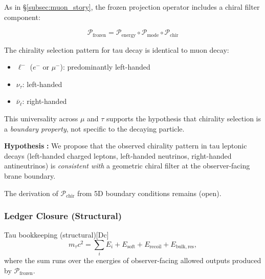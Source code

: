 As in \S\ref{subsec:muon_story}, the frozen projection operator includes a chiral
filter component:

\begin{equation}
    \mathcal{P}_{\mathrm{frozen}} = \mathcal{P}_{\mathrm{energy}} \circ
    \mathcal{P}_{\mathrm{mode}} \circ \mathcal{P}_{\mathrm{chir}}
    \label{eq:tau-projection-stack}
\end{equation}

The chirality selection pattern for tau decay is identical to muon decay:
\begin{itemize}[nosep]
    \item $\ell^-$ ($e^-$ or $\mu^-$): predominantly left-handed
    \item $\nu_\tau$: left-handed
    \item $\bar{\nu}_\ell$: right-handed
\end{itemize}

This universality across $\mu$ and $\tau$ supports the hypothesis that
chirality selection is a \emph{boundary property}, not specific to the
decaying particle.

\begin{tcolorbox}[mechanism, title={Chiral Filter (Hypothesis)}]
\textbf{Hypothesis} \tagP{}\textbf{:} We propose that the observed
chirality pattern in tau leptonic decays (left-handed charged leptons,
left-handed neutrinos, right-handed antineutrinos) is \emph{consistent with}
a geometric chiral filter at the observer-facing brane boundary.

\medskip
The derivation of $\mathcal{P}_{\mathrm{chir}}$ from 5D boundary conditions
remains (open).
\end{tcolorbox}


\subsubsection{Ledger Closure (Structural)}

\begin{edcLedgerBox}{Tau bookkeeping (structural)}{[Dc]}
\begin{equation}
m_\tau c^2 = \sum_i E_i + E_{\mathrm{soft}} + E_{\mathrm{recoil}} + E_{\mathrm{bulk,res}},
\label{eq:tau_ledger}
\end{equation}
where the sum runs over the energies of observer-facing allowed outputs produced by $\mathcal{P}_{\mathrm{frozen}}$.
\end{edcLedgerBox}

